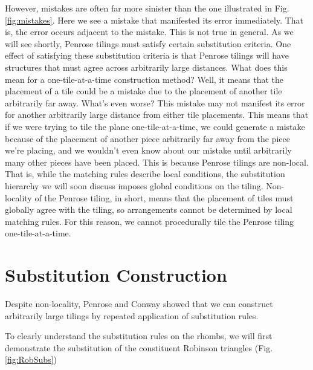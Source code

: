 \documentclass[
  oneside,
  11pt, a4paper,
  footinclude=true,
  headinclude=true,
  cleardoublepage=empty
]{scrbook}
\begin{document}
However, mistakes are often far more sinister than the one illustrated in Fig.\ref{fig:mistakes}. Here we see a mistake that manifested its error immediately. That is, the error occurs adjacent to the mistake. This is not true in general. As we will see shortly, Penrose tilings must satisfy certain substitution criteria. One effect of satisfying these substitution criteria is that Penrose tilings will have structures that must agree across arbitrarily large distances. What does this mean for a one-tile-at-a-time construction method? Well, it means that the placement of a tile could be a mistake due to the placement of another tile arbitrarily far away. What's even worse? This mistake may not manifest its error for another arbitrarily large distance from either tile placements. This means that if we were trying to tile the plane one-tile-at-a-time, we could generate a mistake because of the placement of another piece arbitrarily far away from the piece we're placing, and we wouldn't even know about our mistake until arbitrarily many other pieces have been placed. This is because Penrose tilings are non-local. That is, while the matching rules describe local conditions, the substitution hierarchy we will soon discuss imposes global conditions on the tiling. Non-locality of the Penrose tiling, in short, means that the placement of tiles must globally agree with the tiling, so arrangements cannot be determined by local matching rules. For this reason, we cannot procedurally tile the Penrose tiling one-tile-at-a-time.


\section{Substitution Construction} %
Despite non-locality, Penrose and Conway showed that we can construct arbitrarily large tilings by repeated application of substitution rules.

To clearly understand the substitution rules on the rhombs, we will first demonstrate the substitution of the constituent Robinson triangles (Fig.\ref{fig:RobSubs})
\end{document}
